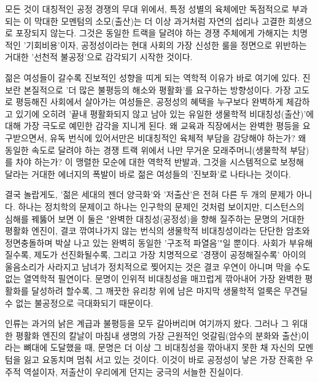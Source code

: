 모든 것이 대칭적인 공정 경쟁의 무대 위에서, 특정 성별의 육체에만 독점적으로 부과되는 이 막대한 모멘텀의 소모(출산)는 더 이상 과거처럼 자연의 섭리나 고결한 희생으로 포장되지 않는다. 그것은 동일한 트랙을 달려야 하는 경쟁 주체에게 가해지는 치명적인 '기회비용'이자, 공정성이라는 현대 사회의 가장 신성한 룰을 정면으로 위반하는 거대한 '선천적 불공정'으로 감각되기 시작한 것이다.

젊은 여성들이 갈수록 진보적인 성향을 띠게 되는 역학적 이유가 바로 여기에 있다. 진보란 본질적으로 '더 많은 불평등의 해소와 평활화'를 요구하는 방향성이다. 가장 고도로 평등해진 사회에서 살아가는 여성들은, 공정성의 혜택을 누구보다 완벽하게 체감하고 있기에 오히려 '끝내 평활화되지 않고 남아 있는 유일한 생물학적 비대칭성(출산)'에 대해 가장 극도로 예민한 감각을 지니게 된다. 왜 교육과 직장에서는 완벽한 평등을 요구받으면서, 유독 번식에 있어서만은 비대칭적인 육체적 부담을 감당해야 하는가? 왜 동일한 속도로 달려야 하는 경쟁 트랙 위에서 나만 무거운 모래주머니(생물학적 부담)를 차야 하는가? 이 맹렬한 모순에 대한 역학적 반발과, 그것을 시스템적으로 보정해 달라는 거대한 에너지의 폭발이 바로 젊은 여성들의 '진보화'로 나타나는 것이다.
 
결국 놀랍게도, '젊은 세대의 젠더 양극화'와 '저출산'은 전혀 다른 두 개의 문제가 아니다. 하나는 정치학의 문제이고 하나는 인구학의 문제인 것처럼 보이지만, 디스턴스의 심해를 꿰뚫어 보면 이 둘은 "완벽한 대칭성(공정성)을 향해 질주하는 문명의 거대한 평활화 엔진이, 결코 깎여나가지 않는 번식의 생물학적 비대칭성이라는 단단한 암초와 정면충돌하며 박살 나고 있는 완벽히 동일한 '구조적 파열음'"일 뿐이다. 사회가 부유해질수록, 제도가 선진화될수록, 그리고 가장 치명적으로 '경쟁이 공정해질수록' 아이의 울음소리가 사라지고 남녀가 정치적으로 찢어지는 것은 결코 우연이 아니며 막을 수도 없는 열역학적 필연이다. 문명이 인위적 비대칭성을 매끄럽게 깎아내어 가장 완벽한 평활화를 달성하려 할수록, 그 깨끗한 유리창 위에 남은 마지막 생물학적 얼룩은 무견딜 수 없는 불공정으로 극대화되기 때문이다. 

인류는 과거의 낡은 계급과 불평등을 모두 갈아버리며 여기까지 왔다. 그러나 그 위대한 평활화 엔진의 칼날이 마침내 생명의 가장 근원적인 엇갈림(암수의 분화와 출산)이라는 뼈대에 도달했을 때, 문명은 더 이상 그 비대칭성을 깎아내지 못한 채 자신의 모멘텀을 잃고 요동치며 멈춰 서고 있는 것이다.
이것이 바로 공정성이 낳은 가장 잔혹한 우주적 역설이자, 저출산이 우리에게 던지는 궁극의 서늘한 진실이다.

